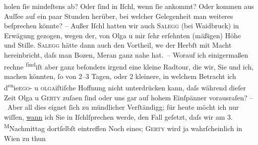\begin{ledgroupsized}[t]{13cm}
               holen ſie mindeſtens ab? Oder ſind in Iſchl, wenn
               ſie ankommt? Oder kommen aus Auſſee auf ein paar
               Stunden herüber, bei welcher Gelegenheit man weiteres beſprechen könnte? – Außer Iſchl hatten wir auch \textsc{Salegg} (bei Waidbruck) in {\pb}Erwägung gezogen, wegen der, von Olga u mir ſehr erſehnten (mäßigen) Höhe und Stille. \textsc{Salegg} hätte dann auch den Vortheil, we{\geminationn} der
                  Herbſt mit Macht hereinbricht, daſs man Bozen, Meran ganz nahe
               hat. –\pend
           \pstart
           Worauf ich einigermaßen rechne \substVorne{}\textsuperscript{ſind}\substDazwischen{}iſt\substHinten{} aber ganz beſonders irgend eine kleine Radtour, die wir, Sie und ich, machen
               könnten, ſo von 2–3 Tagen, oder 2 kleinere, {\pb}in welchem
               Betracht ich d\substVorne{}\textsuperscript{en}\substDazwischen{}ie\substHinten{}{ }\textsc{ego}- u \textsc{olga}iſtiſche Hoffnung nicht unterdrücken kann, daſs während dieſer Zeit Olga u \textsc{Gerty} zuſa{\geminationm}en ſind oder uns gar auf hohem Einſpänner
               vorausraſen?\pend
           \pstart
           – Aber all dies eignet ſich zu mündlicher Verſtändigg; für heute möcht ich nur
               wiſſen, \uline{wann} ich Sie in Iſchlſprechen werde, den Fall geſetzt, daſs wir am
                  3.{ }\substVorne{}\textsuperscript{M}\substDazwischen{}Na\substHinten{}chmittag dortſelbſt eintreffen\pend
           \pstart
           {\pb}Noch eines; \textsc{Gerty} wird ja wahrſcheinlich in Wien zu thun

\end{ledgroupsized}
